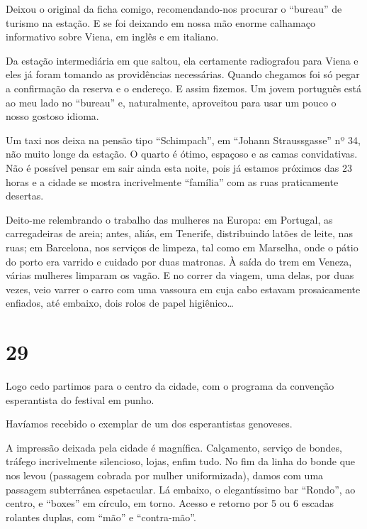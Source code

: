 Deixou o original da ficha comigo, recomendando-nos procurar o ``bureau'' de turismo na estação. E se foi deixando em nossa mão enorme calhamaço informativo sobre Viena, em inglês e em italiano.

Da estação intermediária em que saltou, ela certamente radiografou para Viena e eles já foram tomando as providências necessárias. Quando chegamos foi só pegar a confirmação da reserva e o endereço. E assim fizemos. Um jovem português está ao meu lado no ``bureau'' e, naturalmente, aproveitou para usar um pouco o nosso gostoso idioma.

Um taxi nos deixa na pensão tipo ``Schimpach'', em ``Johann Straussgasse'' nº 34, não muito longe da estação. O quarto é ótimo, espaçoso e as camas convidativas. Não é possível pensar em sair ainda esta noite, pois já estamos próximos das 23 horas e a cidade se mostra incrivelmente ``família'' com as ruas praticamente desertas.

Deito-me relembrando o trabalho das mulheres na Europa: em Portugal, as carregadeiras de areia; antes, aliás, em Tenerife, distribuindo latões de leite, nas ruas; em Barcelona, nos serviços de limpeza, tal como em Marselha, onde o pátio do porto era varrido e cuidado por duas matronas. À saída do trem em Veneza, várias mulheres limparam os vagão. E no correr da viagem, uma delas, por duas vezes, veio varrer o carro com uma vassoura em cuja cabo estavam prosaicamente enfiados, até embaixo, dois rolos de papel higiênico\ldots

\section*{29 \adfflatleafright {}}
Logo cedo partimos para o centro da cidade, com o programa da convenção esperantista do festival em punho.

Havíamos recebido o exemplar de um dos esperantistas genoveses.

A impressão deixada pela cidade é magnífica. Calçamento, serviço de bondes, tráfego incrivelmente silencioso, lojas, enfim tudo. No fim da linha do bonde que nos levou (passagem cobrada por mulher uniformizada), damos com uma passagem subterrânea espetacular. Lá embaixo, o elegantíssimo bar ``Rondo'', ao centro, e ``boxes'' em círculo, em torno. Acesso e retorno por 5 ou 6 escadas rolantes duplas, com ``mão'' e ``contra-mão''.

